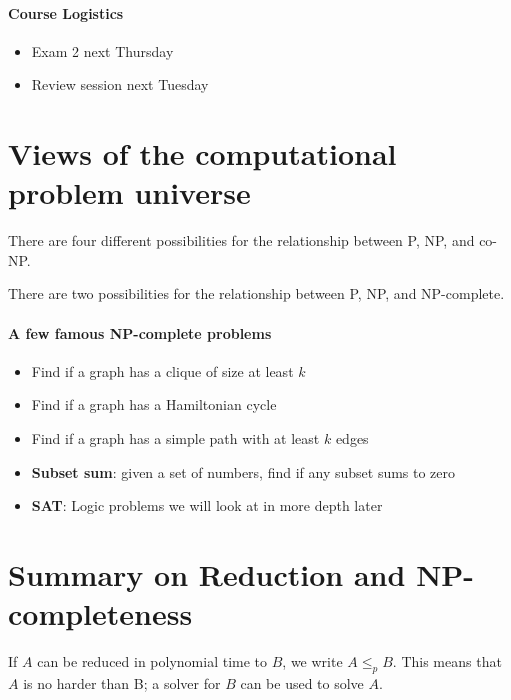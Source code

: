 \documentclass[11  pt]{article}
\begin{document}
	
	\paragraph{Course Logistics}
	\begin{itemize}
		\item Exam 2 next Thursday
		\item Review session next Tuesday
		\end{itemize}
	
	
	\section{Views of the computational problem universe}
	There are four different possibilities for the relationship between P, NP, and co-NP.
	
	
	
	\vfill
	
	There are two possibilities for the relationship between P, NP, and NP-complete.
	
	\vfill
	
	\newpage
	
	\paragraph{A few famous NP-complete problems}
	\begin{itemize}
		\item Find if a graph has a clique of size at least $k$
		\item Find if a graph has a Hamiltonian cycle
		\item Find if a graph has a simple path with at least $k$ edges
		\item \textbf{Subset sum}: given a set of numbers, find if any subset sums to zero
		\item \textbf{SAT}: Logic problems we will look at in more depth later
	\end{itemize}
	
	
	\section{Summary on Reduction and NP-completeness}
	If $A$ can be reduced in polynomial time to $B$, we write $A \leq_p B$. This means that $A$ is no harder than B; a solver for $B$ can be used to solve $A$.\\
	
	\vs{2cm}
	\vfill
	
\end{document}
